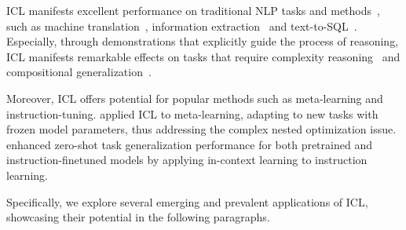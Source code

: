 \label{app}

ICL manifests excellent performance on traditional NLP tasks and methods~\cite{kim2022self,metaicl}, such as machine translation~\cite{zhu2023multilingual,sia2023context}, information extraction~\cite{wan2023gpt,he2023icl} and text-to-SQL~\cite{pourreza2023din}.
Especially, through demonstrations that explicitly guide the process of reasoning, ICL manifests remarkable effects on tasks that require complexity reasoning~\cite{cot,li2023code,teachalgo} and compositional generalization~\cite{least}. 

Moreover, ICL offers potential for popular methods such as meta-learning and instruction-tuning. \citet{chen2021meta} applied ICL to meta-learning, adapting to new tasks with frozen model parameters, thus addressing the complex nested optimization issue. \cite{ye2023context} enhanced zero-shot task generalization performance for both pretrained and instruction-finetuned models by applying in-context learning to instruction learning. 

Specifically, we explore several emerging and prevalent applications of ICL, showcasing their potential in the following paragraphs.


